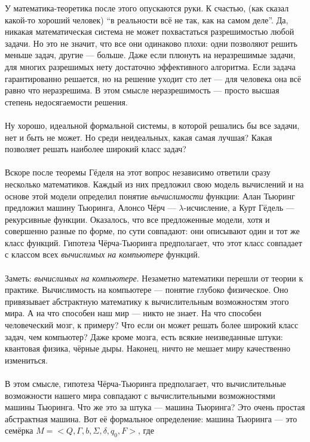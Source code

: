 \documentclass[11pt]{book}
\begin{document}
У математика-теоретика после этого опускаются руки.
К счастью, (как сказал какой-то хороший человек) ``в реальности всё не так, как на самом деле''.
Да, никакая математическая система не может похвастаться разрешимостью любой задачи.
Но это не значит, что все они одинаково плохи: одни позволяют решить меньше задач, другие --- больше.
Даже если плюнуть на неразрешимые задачи, для многих разрешимых нету достаточно эффективного алгоритма.
Если задача гарантированно решается, но на решение уходит сто лет --- для человека она всё равно что неразрешима.
В этом смысле неразрешимость --- просто высшая степень недосягаемости решения.
\\ \\
Ну хорошо, идеальной формальной системы, в которой решались бы все задачи, нет и быть не может.
Но среди неидеальных, какая самая лучшая?
Какая позволяет решать наиболее широкий класс задач?
\\ \\
Вскоре после теоремы Гёделя на этот вопрос независимо ответили сразу несколько математиков.
Каждый из них предложил свою модель вычислений и на основе этой модели определил понятие \emph{вычислимости} функции:
Алан Тьюринг предложил машину Тьюринга, Алонсо Чёрч --- $\lambda$-исчисление, а Курт Гёдель --- рекурсивные функции.
Оказалось, что все предложенные модели, хотя и совершенно разные по форме, по сути совпадают: они описывают один и тот же класс функций.
Гипотеза Чёрча-Тьюринга предполагает, что этот класс совпадает с классом всех \emph{вычислимых на компьютере} функций.
\\ \\
Заметь: \emph{вычислимых на компьютере}.
Незаметно математики перешли от теории к практике.
Вычислимость на компьютере --- понятие глубоко физическое.
Оно привязывает абстрактную математику к вычислительным возможностям этого мира.
А на что способен наш мир --- никто не знает.
На что способен человеческий мозг, к примеру?
Что если он может решать более широкий класс задач, чем компьютер?
Даже кроме мозга, есть всякие неизведанные штуки: квантовая физика, чёрные дыры.
Наконец, ничто не мешает миру качественно измениться.
\\ \\
В этом смысле, гипотеза Чёрча-Тьюринга предполагает, что вычислительные возможности нашего мира
совпадают с вычислительными возможностями машины Тьюринга.
Что же это за штука --- машина Тьюринга?
Это очень простая абстрактная машина.
Вот её формальное определение: машина Тьюринга --- это семёрка $M = <Q, \Gamma, b, \Sigma, \delta, q_0, F>$, где
\end{document}

